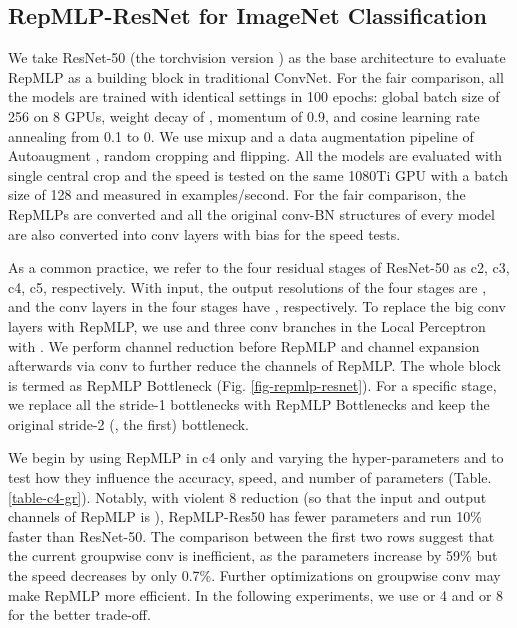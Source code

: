 \documentclass[10pt,twocolumn,letterpaper]{article}
\begin{document}
\subsection{RepMLP-ResNet for ImageNet Classification}



We take ResNet-50 \cite{he2016deep} (the torchvision version \cite{torch-model}) as the base architecture to evaluate RepMLP as a building block in traditional ConvNet. For the fair comparison, all the models are trained with identical settings in 100 epochs: global batch size of 256 on 8 GPUs, weight decay of , momentum of 0.9, and cosine learning rate annealing from 0.1 to 0. We use mixup \cite{zhang2017mixup} and a data augmentation pipeline of Autoaugment \cite{cubuk2019autoaugment}, random cropping and flipping. All the models are evaluated with single central crop and the speed is tested on the same 1080Ti GPU with a batch size of 128 and measured in examples/second. For the fair comparison, the RepMLPs are converted and all the original conv-BN structures of every model are also converted into conv layers with bias for the speed tests. 

As a common practice, we refer to the four residual stages of ResNet-50 as c2, c3, c4, c5, respectively. With  input, the output resolutions of the four stages are , and the  conv layers in the four stages have , respectively. To replace the big  conv layers with RepMLP, we use  and three conv branches in the Local Perceptron with . We perform  channel reduction before RepMLP and  channel expansion afterwards via  conv to further reduce the channels of RepMLP. The whole block is termed as RepMLP Bottleneck (Fig. \ref{fig-repmlp-resnet}). For a specific stage, we replace all the stride-1 bottlenecks with RepMLP Bottlenecks and keep the original stride-2 (\ie, the first) bottleneck.

We begin by using RepMLP in c4 only and varying the hyper-parameters  and  to test how they influence the accuracy, speed, and number of parameters (Table. \ref{table-c4-gr}). Notably, with violent 8 reduction (so that the input and output channels of RepMLP is ), RepMLP-Res50 has fewer parameters and run 10\% faster than ResNet-50. The comparison between the first two rows suggest that the current groupwise  conv is inefficient, as the parameters increase by 59\% but the speed decreases by only 0.7\%. Further optimizations on groupwise  conv may make RepMLP more efficient. In the following experiments, we use  or 4 and  or 8 for the better trade-off.
\end{document}

